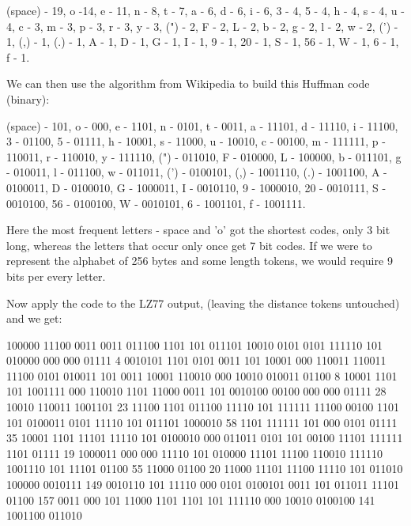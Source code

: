 \documentclass[12pt]{article}
\begin{document}
\begin{bashcode}
(space) - 19, o -14, e - 11, n - 8, t - 7, a - 6, d - 6, i - 6, 3 - 4, 5
- 4, h - 4, s - 4, u - 4, c - 3, m - 3, p - 3, r - 3, y - 3, (") - 2, F
- 2, L - 2, b - 2, g - 2, l - 2, w - 2, (') - 1, (,) - 1, (.) - 1, A -
1, D - 1, G - 1, I - 1, 9 - 1, 20 - 1, S - 1, 56 - 1, W - 1, 6 - 1, f -
1.
\end{bashcode}

We can then use the algorithm from Wikipedia to build this Huffman code (binary):

\begin{bashcode}
(space) - 101, o - 000, e - 1101, n - 0101, t - 0011, a - 11101, d -
11110, i - 11100, 3 - 01100, 5 - 01111, h - 10001, s - 11000, u - 10010,
c - 00100, m - 111111, p - 110011, r - 110010, y - 111110, (") - 011010,
F - 010000, L - 100000, b - 011101, g - 010011, l - 011100, w - 011011,
(') - 0100101, (,) - 1001110, (.) - 1001100, A - 0100011, D - 0100010, G
- 1000011, I - 0010110, 9 - 1000010, 20 - 0010111, S - 0010100, 56 -
0100100, W - 0010101, 6 - 1001101, f - 1001111.
\end{bashcode}

Here the most frequent letters - space and 'o' got the shortest codes,
only 3 bit long, whereas the letters that occur only once get 7 bit
codes. If we were to represent the alphabet of 256 bytes and some length
tokens, we would require 9 bits per every letter.

Now apply the code to the LZ77 output, (leaving the distance tokens
untouched) and we get:

\begin{bashcode}
  100000 11100 0011 0011 011100 1101 101 011101 10010 0101 0101 111110
  101 010000 000 000 01111 4 0010101 1101 0101 0011 101 10001 000 110011
  110011 11100 0101 010011 101 0011 10001 110010 000 10010 010011 01100
  8 10001 1101 101 1001111 000 110010 1101 11000 0011 101 0010100 00100
  000 000 01111 28 10010 110011 1001101 23 11100 1101 011100 11110 101
  111111 11100 00100 1101 101 0100011 0101 11110 101 011101 1000010 58
  1101 111111 101 000 0101 01111 35 10001 1101 11101 11110 101 0100010
  000 011011 0101 101 00100 11101 111111 1101 01111 19 1000011 000 000
  11110 101 010000 11101 11100 110010 111110 1001110 101 11101 01100 55
  11000 01100 20 11000 11101 11100 11110 101 011010 100000 0010111 149
  0010110 101 11110 000 0101 0100101 0011 101 011011 11101 01100 157
  0011 000 101 11000 1101 1101 101 111110 000 10010 0100100 141 1001100
  011010
\end{bashcode}
\end{document}
